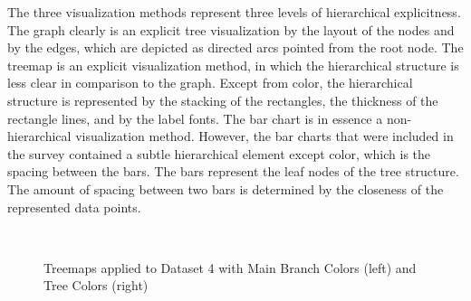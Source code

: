 \documentclass[journal]{vgtc}                %
\begin{document}
The three visualization methods represent three levels of hierarchical explicitness. The graph clearly is an explicit tree visualization by the layout of the nodes and by the edges, which are depicted as directed arcs pointed from the root node. The treemap is an explicit visualization method, in which the hierarchical structure is less clear in comparison to the graph. Except from color, the hierarchical structure is represented by the stacking of the rectangles, the thickness of the rectangle lines, and by the label fonts. The bar chart is in essence a non-hierarchical visualization method. However, the bar charts that were included in the survey contained a subtle hierarchical element except color, which is the spacing between the bars. The bars represent the leaf nodes of the tree structure. The amount of spacing between two bars is determined by the closeness of the represented data points.


\begin{figure}[tb]
  \centering
  \mbox{
  }
  \caption{Treemaps applied to Dataset 4 with Main Branch Colors (left) and Tree Colors (right)}\label{fig:treemapSvy}

\end{figure}
\end{document}
